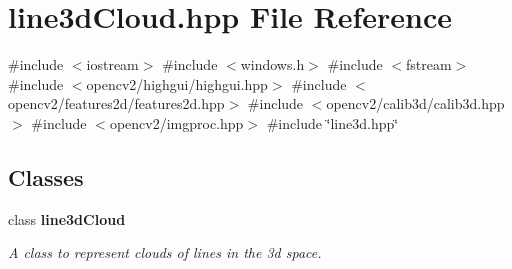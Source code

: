 \section{line3d\+Cloud.\+hpp File Reference}
\label{line3d_cloud_8hpp}
{\ttfamily \#include $<$iostream$>$}\newline
{\ttfamily \#include $<$windows.\+h$>$}\newline
{\ttfamily \#include $<$fstream$>$}\newline
{\ttfamily \#include $<$opencv2/highgui/highgui.\+hpp$>$}\newline
{\ttfamily \#include $<$opencv2/features2d/features2d.\+hpp$>$}\newline
{\ttfamily \#include $<$opencv2/calib3d/calib3d.\+hpp$>$}\newline
{\ttfamily \#include $<$opencv2/imgproc.\+hpp$>$}\newline
{\ttfamily \#include \char`\"{}line3d.\+hpp\char`\"{}}\newline
\subsection*{Classes}
\begin{DoxyCompactItemize}
\item 
class \textbf{ line3d\+Cloud}
\begin{DoxyCompactList}\small\item\em A class to represent clouds of lines in the 3d space. \end{DoxyCompactList}\end{DoxyCompactItemize}
